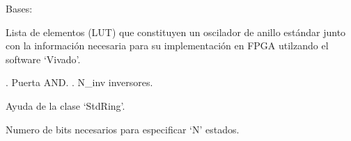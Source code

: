 \documentclass[letterpaper,10pt,english]{sphinxmanual}
\begin{document}
\begin{fulllineitems}
\label{\detokenize{myfpga:myfpga.ring_osc.StdRing}}
\pysigstartsignatures
{}
\pysigstopsignatures
\sphinxAtStartPar
Bases: 

\sphinxAtStartPar
Lista de elementos (LUT) que constituyen un oscilador de anillo
estándar junto con la información necesaria para su implementación
en FPGA utilzando el software ‘Vivado’.
\begin{description}
\sphinxAtStartPar
. Puerta AND.
. N\_inv inversores.

\end{description}

\begin{fulllineitems}
\label{\detokenize{myfpga:myfpga.ring_osc.StdRing.help}}
\pysigstartsignatures
{}
\pysigstopsignatures
\sphinxAtStartPar
Ayuda de la clase ‘StdRing’.

\end{fulllineitems}


\end{fulllineitems}


\begin{fulllineitems}
\label{\detokenize{myfpga:myfpga.ring_osc.clog2}}
\pysigstartsignatures
{}
\pysigstopsignatures
\sphinxAtStartPar
Numero de bits necesarios para especificar ‘N’ estados.

\end{fulllineitems}
\end{document}
